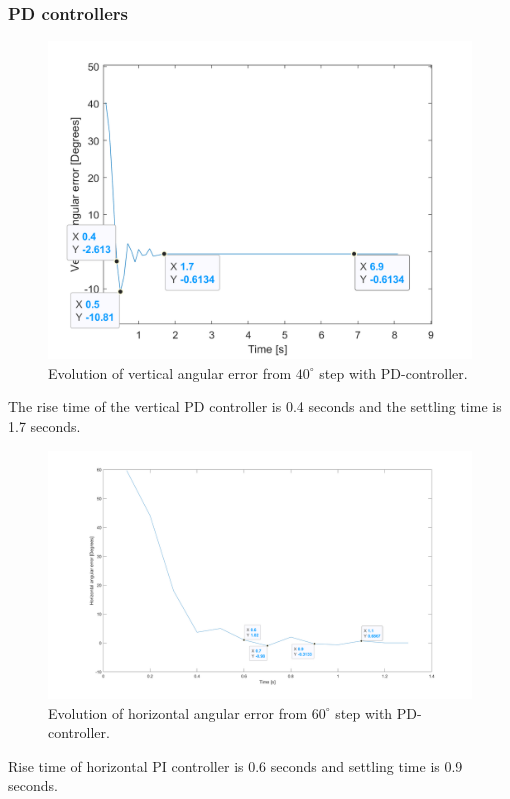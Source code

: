 \subsubsection{PD controllers}
\begin{figure}[H]
\centering
\includegraphics[width=\textwidth]{assets/Vertical_PD_controller.png}
\caption{Evolution of vertical angular error from \(40^{\circ}\) step with PD-controller.}
\label{vert_P}
\end{figure}
The rise time of the vertical PD controller is 0.4 seconds and the settling time is 1.7 seconds.
\begin{figure}[H]
\centering
\includegraphics[width=\textwidth]{assets/Horizontal_PD_controller.png}
\caption{Evolution of horizontal angular error from \(60^{\circ}\) step with PD-controller.}
\label{vert_P}
\end{figure}
Rise time of horizontal PI controller is 0.6 seconds and settling time is 0.9 seconds.

